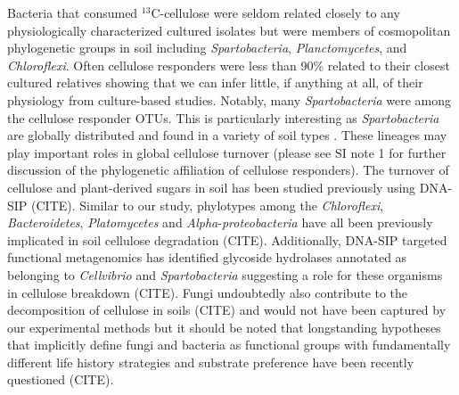 Bacteria that consumed $^{13}$C-cellulose were seldom related closely to any
physiologically characterized cultured isolates but were members of
cosmopolitan phylogenetic groups in soil including \textit{Spartobacteria},
\textit{Planctomycetes}, and \textit{Chloroflexi}. Often cellulose responders
were less than 90\% related to their closest cultured relatives showing that we
can infer little, if anything at all, of their physiology from culture-based
studies. Notably, many \textit{Spartobacteria} were among the cellulose responder OTUs.
This is particularly interesting as \textit{Spartobacteria} are globally
distributed and found in a variety of soil types \citep{Bergmann_2011}. These lineages may play
important roles in global cellulose turnover (please see SI note 1 for further
discussion of the phylogenetic affiliation of cellulose responders). 
The turnover of cellulose and plant-derived sugars in soil has been studied
previously using DNA-SIP (CITE). Similar to our study, phylotypes among the
\textit{Chloroflexi}, \textit{Bacteroidetes}, \textit{Platomycetes} and
\textit{Alpha}-\textit{proteobacteria} have all been previously implicated in
soil cellulose degradation (CITE). Additionally, DNA-SIP targeted
functional metagenomics has identified glycoside hydrolases annotated as belonging
to \textit{Cellvibrio} and \textit{Spartobacteria} suggesting a role for these organisms
in cellulose breakdown (CITE). Fungi undoubtedly also contribute to the decomposition
of cellulose in soils (CITE) and would not have been captured by our
experimental methods but it should be noted that longstanding hypotheses that implicitly
define fungi and bacteria as functional groups with fundamentally different life
history strategies and substrate preference have been recently questioned (CITE).

